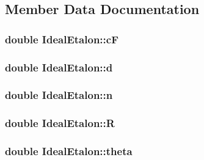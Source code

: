 \subsection{Member Data Documentation}
\subsubsection[{\texorpdfstring{cF}{cF}}]{\setlength{\rightskip}{0pt plus 5cm}double Ideal\+Etalon\+::cF\hspace{0.3cm}{\ttfamily [private]}}\hypertarget{class_ideal_etalon_a93f909e0b51e64a057ac90985c5257fc}{}\label{class_ideal_etalon_a93f909e0b51e64a057ac90985c5257fc}
\subsubsection[{\texorpdfstring{d}{d}}]{\setlength{\rightskip}{0pt plus 5cm}double Ideal\+Etalon\+::d\hspace{0.3cm}{\ttfamily [private]}}\hypertarget{class_ideal_etalon_a8f63e477f8637502ef97b2f45875f57a}{}\label{class_ideal_etalon_a8f63e477f8637502ef97b2f45875f57a}
\subsubsection[{\texorpdfstring{n}{n}}]{\setlength{\rightskip}{0pt plus 5cm}double Ideal\+Etalon\+::n\hspace{0.3cm}{\ttfamily [private]}}\hypertarget{class_ideal_etalon_a1b1004d0898c3a054ca9cf412813c9d5}{}\label{class_ideal_etalon_a1b1004d0898c3a054ca9cf412813c9d5}
\subsubsection[{\texorpdfstring{R}{R}}]{\setlength{\rightskip}{0pt plus 5cm}double Ideal\+Etalon\+::R\hspace{0.3cm}{\ttfamily [private]}}\hypertarget{class_ideal_etalon_ae545946e739c8079c0ced7f836180cd1}{}\label{class_ideal_etalon_ae545946e739c8079c0ced7f836180cd1}
\subsubsection[{\texorpdfstring{theta}{theta}}]{\setlength{\rightskip}{0pt plus 5cm}double Ideal\+Etalon\+::theta\hspace{0.3cm}{\ttfamily [private]}}\hypertarget{class_ideal_etalon_adb01dc93fb40a0735b5ed00907ffe0fd}{}\label{class_ideal_etalon_adb01dc93fb40a0735b5ed00907ffe0fd}


